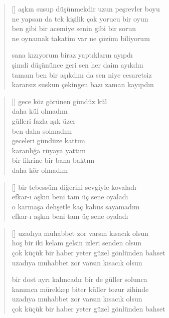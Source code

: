 \documentclass[a5paper, openright, twoside]{memoir}
\begin{document}
\begin{verse}[\versewidth]
  aşkın susup düşünmekdir uzun peşrevler boyu \\
  ne yapsan da tek kişilik çok yorucu bir oyun \\
  ben gibi bir acemiye senin gibi bir sorun \\
  ne oynamak takatim var ne çözüm biliyorum

  sana kızıyorum biraz yaptıkların ayıpdı \\
  şimdi düşününce geri sen her daim ayıkdın \\
  tamam ben bir aşıkdım da sen niye cesaretsiz \\
  kararsız suskun çekingen bazı zaman kayıpdın \\
\end{verse}
\begin{verse}[\versewidth]
  gece köz görünen gündüz kül \\
  daha kül olmadım \\
  gülleri fazla ışık üzer \\
  ben daha solmadım \\
  geceleri gündüze kattım \\
  karanlığa rüyaya yattım \\
  bir fikrine bir bana baktım \\
  daha kör olmadım \\
\end{verse}
\begin{verse}[\versewidth]
  bir tebessüm diğerini sevgiyle kovaladı \\
  efkar-ı aşkın beni tam üç sene oyaladı \\
  o karmaşa dehşetle kaç kabus sayamadım \\
  efkar-ı aşkın beni tam üç sene oyaladı \\
\end{verse}
\begin{verse}[\versewidth]
  uzadıya muhabbet zor varsın kısacık olsun \\
  hoş bir iki kelam gelsin izleri senden olsun \\
  çok küçük bir haber yeter güzel gönlünden bahset \\
  uzadıya muhabbet zor varsın kısacık olsun

  bir dost ayrı kalıncadır bir de güller solunca \\
  kanımca mürekkep biter küller tozur zihinde \\
  uzadıya muhabbet zor varsın kısacık olsun \\
  çok küçük bir haber yeter güzel gönlünden bahset \\
\end{verse}
\end{document}
